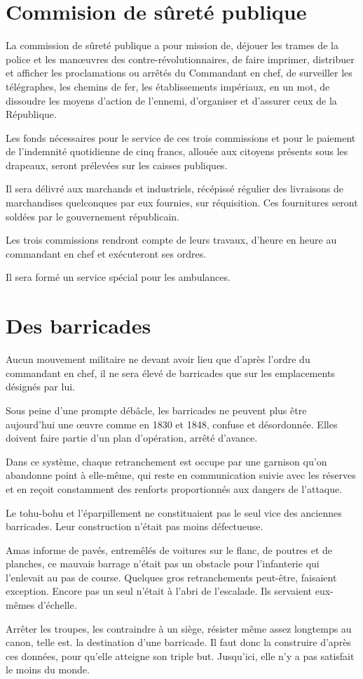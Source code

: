 \documentclass[french,twoside]{book} %
\begin{document}
\section[{Commision de sûreté publique}]{Commision de sûreté publique}\renewcommand{\leftmark}{Commision de sûreté publique}

\noindent La commission de sûreté publique a pour mission de, déjouer les trames de la police et les manœuvres des contre-révolutionnaires, de faire imprimer, distribuer et afficher les proclamations ou arrêtés du Commandant en chef, de surveiller les télégraphes, les chemins de fer, les établissements impériaux, en un mot, de dissoudre les moyens d’action de l’ennemi, d’organiser et d’assurer ceux de la République.\par
Les fonds nécessaires pour le service de ces trois commissions et pour le paiement de l’indemnité quotidienne de cinq francs, allouée aux citoyens présents sous les drapeaux, seront prélevées sur les caisses publiques.\par
Il sera délivré aux marchands et industriels, récépissé régulier des livraisons de marchandises quelconques par eux fournies, sur réquisition. Ces fournitures seront soldées par le gouvernement républicain.\par
Les trois commissions rendront compte de leurs travaux, d’heure en heure au commandant en chef et exécuteront ses ordres.\par
Il sera formé un service spécial pour les ambulances.
\section[{Des barricades}]{Des barricades}\renewcommand{\leftmark}{Des barricades}

\noindent Aucun mouvement militaire ne devant avoir lieu que d’après l’ordre du commandant en chef, il ne sera élevé de barricades que sur les emplacements désignés par lui.\par
Sous peine d’une prompte débâcle, les barricades ne peuvent plus être aujourd’hui une œuvre comme en 1830 et 1848, confuse et désordonnée. Elles doivent faire partie d’un plan d’opération, arrêté d’avance.\par
Dans ce système, chaque retranchement est occupe par une garnison qu’on abandonne point à elle-même, qui reste en communication suivie avec les réserves et en reçoit constamment des renforts proportionnés aux dangers de l’attaque.\par
Le tohu-bohu et l’éparpillement ne constituaient pas le seul vice des anciennes barricades. Leur construction n’était pas moins défectueuse.\par
Amas informe de pavés, entremêlés de voitures sur le flanc, de poutres et de planches, ce mauvais barrage n’était pas un obstacle pour l’infanterie qui l’enlevait au pas de course. Quelques gros retranchements peut-être, faisaient exception. Encore pas un seul n’était à l’abri de l’escalade. Ils servaient eux-mêmes d’échelle.\par
Arrêter les troupes, les contraindre à un siège, résister même assez longtemps au canon, telle est. la destination d’une barricade. Il faut donc la construire d’après ces données, pour qu’elle atteigne son triple but. Jusqu’ici, elle n’y a pas satisfait le moins du monde.
\end{document}
